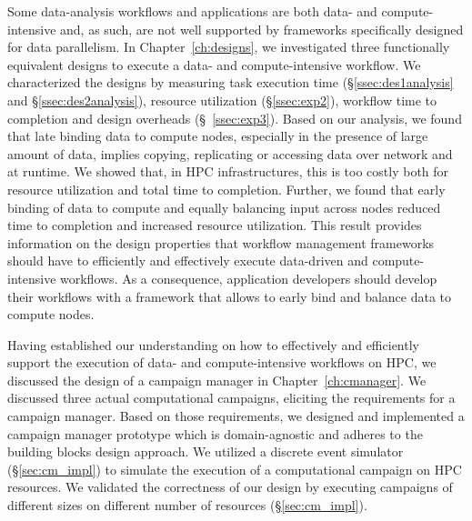 Some data-analysis workflows and applications are both data- and
compute-intensive and, as such, are not well supported by frameworks
specifically designed for data parallelism. In Chapter~\ref{ch:designs}, we
investigated three functionally equivalent designs to execute a data- and
compute-intensive workflow. We characterized the designs by measuring task
execution time (\S\ref{ssec:des1analysis} and \S\ref{ssec:des2analysis}),
resource utilization (\S\ref{ssec:exp2}), workflow time to completion and design
overheads (\S~\ref{ssec:exp3}). Based on our analysis, we found that late
binding data to compute nodes, especially in the presence of large amount of
data, implies copying, replicating or accessing data over network and at
runtime. We showed that, in HPC infrastructures, this is too costly both for
resource utilization and total time to completion. Further, we found that early
binding of data to compute and equally balancing input across nodes reduced time
to completion and increased resource utilization. This result provides
information on the design properties that workflow management frameworks
should have to efficiently and effectively execute data-driven and
compute-intensive workflows. As a consequence, application developers should
develop their workflows with a framework that allows to early bind and balance
data to compute nodes.

Having established our understanding on how to effectively and efficiently
support the execution of data- and compute-intensive workflows on HPC, we
discussed the design of a campaign manager in Chapter~\ref{ch:cmanager}. We
discussed three actual computational campaigns, eliciting the requirements for a
campaign manager. Based on those requirements, we designed and implemented a
campaign manager prototype which is domain-agnostic and adheres to the building
blocks design approach. We utilized a discrete event simulator
(\S\ref{sec:cm_impl}) to simulate the execution of a computational campaign on
HPC resources. We validated the correctness of our design by executing campaigns
of different sizes on different number of resources (\S\ref{sec:cm_impl}).

